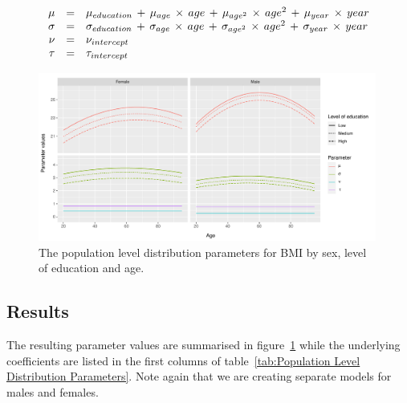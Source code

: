\documentclass{imammb}
\numberwithin{equation}{section}
\begin{document}
\vspace{-1mm}

\begin{equation}
\label{eq:Population Level Distribution Parameters}
\begin{array}{@{\ }rcl@{\ }}
\mu & = & \mu_{education} \, + \, \mu_{age} \, \times \, age \, + \, \mu_{age^2} \, \times \, age^2 \, + \, \mu_{year} \, \times \, year\\
\sigma & = & \sigma_{education} \, + \, \sigma_{age} \, \times \, age \, + \, \sigma_{age^2} \, \times \, age^2 \, + \, \sigma_{year} \, \times \, year \\
\nu & = & \nu_{intercept}\\
\tau & = & \tau_{intercept}
\end{array}
\end{equation}

\vspace{-3mm}

\begin{figure}[!h]
\centering
\includegraphics[width=0.99\textwidth] {"Figures/Population Level Distribution Parameters.pdf"}
\caption{The population level distribution parameters for BMI by sex, level of education and age.}
\label{fig:Population Level Distribution Parameters}
\vspace*{-9pt}
\end{figure}

\subsection{Results}
\label{sec:Population Level Distribution/Results}

The resulting parameter values are summarised in figure~\ref{fig:Population Level Distribution Parameters} while the underlying coefficients are listed in the first columns of table~\ref{tab:Population Level Distribution Parameters}. Note again that we are creating separate models for males and females.
\end{document}

